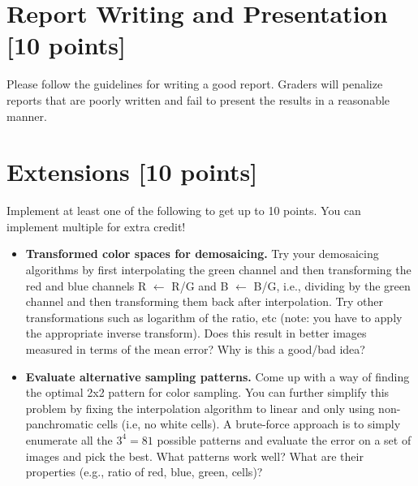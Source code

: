 \documentclass[10pt,letterpaper]{article}
\begin{document}
\section{Report Writing and Presentation [10 points]}

Please follow the guidelines for writing a good report.
Graders will penalize reports that are poorly written and fail to present the results in a reasonable manner.



\section{Extensions [10 points]}
Implement at least one of the following to get up to 10 points. You can implement multiple for extra credit!

\begin{itemize}
\item \textbf{Transformed color spaces for demosaicing.} Try your demosaicing algorithms by first interpolating the green channel and then transforming the red and blue channels R $\leftarrow$ R/G and B $\leftarrow$ B/G, i.e., dividing by the green channel and then transforming them back after interpolation. Try other transformations such as logarithm of the ratio, etc (note: you have to apply the appropriate inverse transform). Does this result in better images measured in terms of the mean error? Why is this a good/bad idea? 

\item \textbf{Evaluate alternative sampling patterns.} Come up with a way of finding the optimal 2x2 pattern for color sampling. You can further simplify this problem by fixing the interpolation algorithm to linear and only using non-panchromatic cells (i.e, no white cells). A brute-force approach is to simply enumerate all the $3^4 = 81$ possible patterns and evaluate the error on a set of images and pick the best. What patterns work well? What are their properties (e.g., ratio of red, blue, green, cells)?

\end{itemize}

%
%
\end{document}
